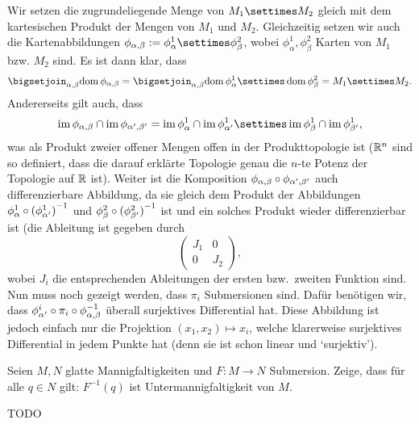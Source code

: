 \documentclass{article}
\begin{document}
\begin{solution}
    Wir setzen die zugrundeliegende Menge von $M_1\settimes M_2$ gleich mit dem kartesischen Produkt der Mengen von $M_1$ und $M_2$. Gleichzeitig setzen wir auch die Kartenabbildungen $\phi_{\alpha,\beta}:=\phi^1_{\alpha}\settimes\phi^2_{\beta}$, wobei $\phi^1_{\alpha},\phi^2_{\beta}$ Karten von $M_1$ bzw. $M_2$ sind.
    Es ist dann klar, dass
    $$
    \bigsetjoin_{\alpha,\beta}{\dom{\phi_{\alpha,\beta}}}=\bigsetjoin_{\alpha,\beta}{\dom\phi^1_{\alpha}\settimes\dom\phi^2_{\beta}}=M_1\settimes M_2.
    $$
    Andererseits gilt auch, dass
    $$
    \im\phi_{\alpha,\beta}\setmeet\im\phi_{\alpha',\beta'}=\im\phi^1_{\alpha}\setmeet\im\phi^1_{\alpha'}\settimes\im\phi^1_{\beta}\setmeet\im\phi^1_{\beta'},
    $$
    was als Produkt zweier offener Mengen offen in der Produkttopologie ist ($\mathbb{R}^n$ sind so definiert, dass die darauf erklärte Topologie genau die $n$-te Potenz der Topologie auf $\mathbb{R}$ ist).
    Weiter ist die Komposition $\phi_{\alpha,\beta}\circ\phi_{\alpha',\beta'}$ auch differenzierbare Abbildung, da sie gleich dem Produkt der Abbildungen $\phi^1_{\alpha}\circ{(\phi^1_{\alpha'})}^{-1}$ und $\phi^2_{\beta}\circ{(\phi^2_{\beta'})}^{-1}$ ist und ein solches Produkt wieder differenzierbar ist (die Ableitung ist gegeben durch
    $$
    \begin{pmatrix}
        J_1 & 0\\
        0 & J_2
    \end{pmatrix},
    $$ wobei $J_i$ die entsprechenden Ableitungen der ersten bzw.\ zweiten Funktion sind.
    Nun muss noch gezeigt werden, dass $\pi_i$ Submersionen sind.
    Dafür benötigen wir, dass $\phi^i_{\alpha'}\circ\pi_i\circ\phi_{\alpha,\beta}^{-1}$ überall surjektives Differential hat. Diese Abbildung ist jedoch einfach nur die Projektion $(x_1,x_2)\mapsto x_i$, welche klarerweise surjektives Differential in jedem Punkte hat (denn sie ist schon linear und `surjektiv').
\end{solution}

\begin{exercise}
    Seien $M,N$ glatte Mannigfaltigkeiten und $F:M\to N$ Submersion. Zeige, dass für alle $q\in N$ gilt: $F^{-1}(q)$ ist Untermannigfaltigkeit von $M$.
\end{exercise}

\begin{solution}
    TODO
\end{solution}
\end{document}

